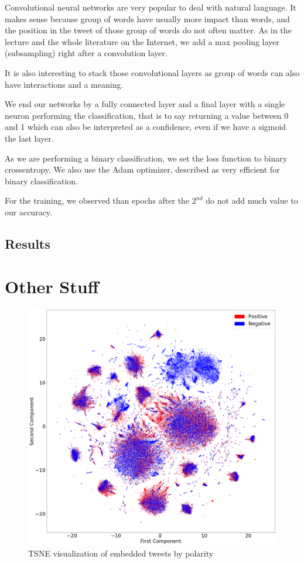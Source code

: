 \documentclass[10pt,conference,compsocconf]{IEEEtran}
\begin{document}
Convolutional neural networks are very popular to deal with natural language. It makes sense because group of words have usually more impact than words, and the position in the tweet of those group of words do not often matter.
As in the lecture and the whole literature on the Internet, we add a max pooling layer (subsampling) right after a convolution layer.

It is also interesting to stack those convolutional layers as group of words can also have interactions and a meaning.

We end our networks by a fully connected layer and a final layer with a single neuron performing the classification, that is to say returning a value between 0 and 1 which can also be interpreted as a confidence, even if we have a sigmoid the last layer.

As we are performing a binary classification, we set the loss function to binary crossentropy. We also use the Adam optimizer, described as very efficient for binary classification.

For the training, we observed than epochs after the $2^{nd}$ do not add much value to our accuracy.

\subsection{Results}

\section{Other Stuff}
\begin{figure}[h]
    \centering
    \includegraphics[width=\linewidth]{imag/tweets_tsne.png}
    \caption{TSNE visualization of embedded tweets by polarity}
    \label{fig:my_label}
\end{figure}
\end{document}
